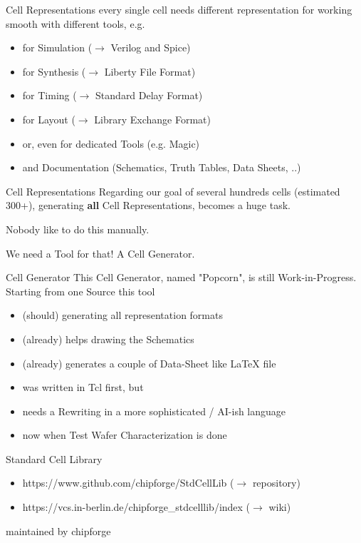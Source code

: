 \documentclass[aspectratio=169]{beamer}
\begin{document}
\begin{frame}{Cell Representations}
every single cell needs different representation for working smooth with different tools, e.g.
	\begin{itemize}
		\item for Simulation ($\rightarrow$ Verilog and Spice)
		\item for Synthesis ($\rightarrow$ Liberty File Format)
		\item for Timing ($\rightarrow$ Standard Delay Format)
		\item for Layout ($\rightarrow$ Library Exchange Format)
		\item or, even for dedicated Tools (e.g. Magic)
		\item and Documentation (Schematics, Truth Tables, Data Sheets, ..)
	\end{itemize}
\end{frame}

\begin{frame}{Cell Representations}
Regarding our goal of several hundreds cells (estimated 300+),
generating \textbf{all} Cell Representations, becomes a huge task.


Nobody like to do this manually.


We need a Tool for that! A Cell Generator.
\end{frame}

\begin{frame}{Cell Generator}
This Cell Generator, named "Popcorn", is still Work-in-Progress.
Starting from one Source this tool
	\begin{itemize}
		\item (should) generating all representation formats
		\item (already) helps drawing the Schematics
		\item (already) generates a couple of Data-Sheet like LaTeX file
		\item was written in Tcl first, but
		\item needs a Rewriting in a more sophisticated / AI-ish language
		\item now when Test Wafer Characterization is done
	\end{itemize}
\end{frame}

\begin{frame}{Standard Cell Library}
	\begin{itemize}
        \setlength\itemsep{1em}
		\item https://www.github.com/chipforge/StdCellLib ($\rightarrow$ repository)
		\item https://vcs.in-berlin.de/chipforge\_stdcelllib/index ($\rightarrow$ wiki)
	\end{itemize}

maintained by chipforge
\end{frame}
\end{document}
